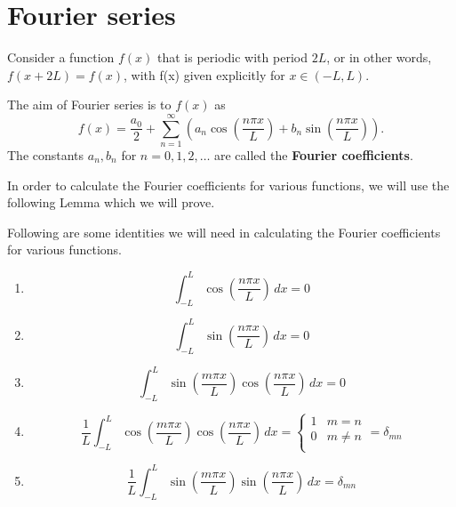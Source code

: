 \chapter{Fourier series}

Consider a function $f(x)$ that is periodic with period $2L$, or in other words, $f(x+2L)=f(x)$, with f(x) given explicitly for $x\in(-L,L)$.

The aim of Fourier series is to $f(x)$ as \[f(x)=\frac{a_0}2+\sum^\infty_{n=1}\left(a_n\cos{\left(\frac{n\pi x}{L}\right)}+b_n\sin{\left(\frac{n\pi x}{L}\right)}\right).\] The constants $a_n,b_n$ for $n=0,1,2,\ldots$ are called the \textbf{Fourier coefficients}.

In order to calculate the Fourier coefficients for various functions, we will use the following Lemma which we will prove.

\begin{lemma}
    Following are some identities we will need in calculating the Fourier coefficients for various functions.
    \begin{enumerate}
        \item \[\int_{-L}^L\cos{\left(\dfrac{n\pi x}{L}\right)}\,dx=0\]
        
        \item \[\int_{-L}^L\sin{\left(\dfrac{n\pi x}{L}\right)}\,dx=0\]
        
        \item \[\int_{-L}^L\sin{\left(\dfrac{m\pi x}{L}\right)}\cos{\left(\dfrac{n\pi x}{L}\right)}\,dx=0\]
        
        \item \[
            \frac{1}{L} \int_{-L}^L \cos{\left(\dfrac{m\pi x}{L}\right)} \cos{\left(\dfrac{n \pi x}{L}\right)} \, dx =
            \begin{cases}
                1 & m = n\\
                0 & m \neq n\\
            \end{cases}
            = \delta_{mn}
         \]
         
        \item \[
            \frac{1}{L} \int_{-L}^L \sin{\left(\dfrac{m\pi x}{L}\right)} \sin{\left(\dfrac{n \pi x}{L}\right)} \, dx = \delta_{mn}
         \]
    \end{enumerate}
\end{lemma}

